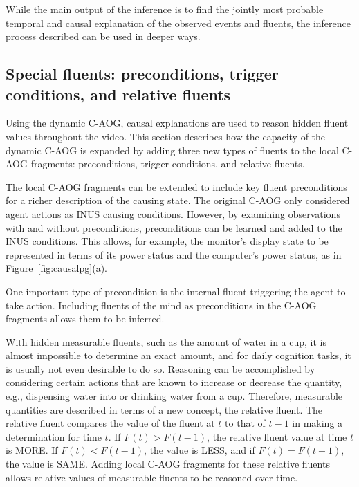 \documentclass[10pt,journal,letterpaper,compsoc]{IEEEtran}
\begin{document}
While the main output of the inference is to find the jointly most probable temporal and causal explanation of the observed events and fluents, the inference process described can be used in deeper ways.

\subsection{Special fluents: preconditions, trigger conditions, and relative fluents}

Using the dynamic C-AOG, causal explanations are used to reason hidden fluent values throughout the video.  This section describes how the capacity of the dynamic C-AOG is expanded by adding three new types of fluents to the local C-AOG fragments: preconditions, trigger conditions, and relative fluents.

The local C-AOG fragments can be extended to include key fluent preconditions for a richer description of the causing state.  The original C-AOG only considered agent actions as INUS causing conditions.  However, by examining observations with and without preconditions, preconditions can be learned and added to the INUS conditions.  This allows, for example, the monitor's display state to be represented in terms of its power status and the computer's power status, as in Figure~\ref{fig:causalpg}(a).  

One important type of precondition is the internal fluent triggering the agent to take action.  Including fluents of the mind as preconditions in the C-AOG fragments allows them to be inferred.  

With hidden measurable fluents, such as the amount of water in a cup, it is almost impossible to determine an exact amount, and for daily cognition tasks, it is usually not even desirable to do so.  Reasoning can be accomplished by considering certain actions that are known to increase or decrease the quantity, e.g., dispensing water into or drinking water from a cup.  Therefore, measurable quantities are described in terms of a new concept, the relative fluent.  The relative fluent compares the value of the fluent at $t$ to that of $t-1$ in making a determination for time $t$.  If $F(t) > F(t-1)$, the relative fluent value at time $t$ is MORE.  If $F(t) < F(t-1)$, the value is LESS, and if $F(t) = F(t-1)$, the value is SAME.  Adding local C-AOG fragments for these relative fluents allows relative values of measurable fluents to be reasoned over time.
\end{document}
